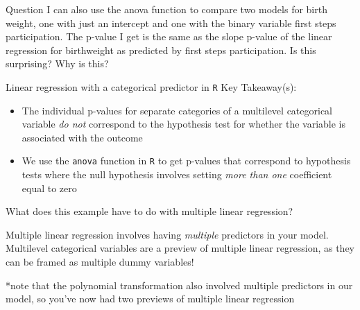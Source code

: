 \documentclass[10pt,t]{beamer}
\begin{document}
\begin{frame}{Question}
	I can also use the anova function to compare two models for birth weight, one with just an intercept and one with the binary variable first steps participation. The p-value I get is the same as the slope p-value of the linear regression for birthweight as predicted by first steps participation. Is this surprising? Why is this?
\end{frame}

\begin{frame}{Linear regression with a categorical predictor in \texttt{R}}
Key Takeaway(s):
\vspace{0.3cm}

\begin{itemize}
	\item The individual p-values for separate categories of a multilevel categorical variable \textit{do not} correspond to the hypothesis test for whether the variable is associated with the outcome
	
	\medskip
	
	\item We use the \texttt{anova} function in \texttt{R} to get p-values that correspond to hypothesis tests where the null hypothesis involves setting \textit{more than one} coefficient equal to zero
\end{itemize} \pause

\vspace{0.3cm}

What does this example have to do with multiple linear regression? 

\vspace{0.3cm}

Multiple linear regression involves having \textit{multiple} predictors in your model. Multilevel categorical variables are a preview of multiple linear regression, as they can be framed as multiple dummy variables! \pause

\vspace{0.2cm}

*note that the polynomial transformation also involved multiple predictors in our model, so you've now had two previews of multiple linear regression

\end{frame}
\end{document}
